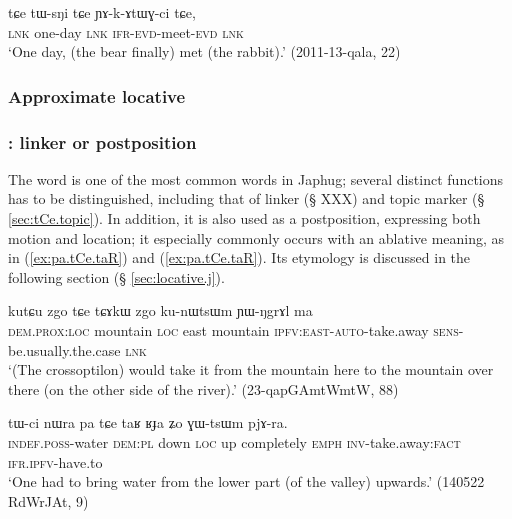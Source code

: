  \begin{exe}
\ex \label{ex:tWsNi.tCe}
\gll   tɕe tɯ-sŋi tɕe ɲɤ-k-ɤtɯɣ-ci tɕe, \\
\textsc{lnk} one-day \textsc{lnk} \textsc{ifr}-\textsc{evd}-meet-\textsc{evd} \textsc{lnk} \\
\glt  `One day, (the bear finally) met (the rabbit).' (2011-13-qala, 22)
\end{exe}


\subsubsection{Approximate locative} \label{sec:approximate.locative}


\subsubsection{: linker or postposition} \label{sec:tCe.postposition}
The word  is one of the most common words in Japhug; several distinct functions has to be distinguished, including that of linker (§ XXX) and topic marker (§ \ref{sec:tCe.topic}). In addition, it is also used as a postposition, expressing both motion and location; it especially commonly occurs with an ablative meaning, as in (\ref{ex:pa.tCe.taR}) and (\ref{ex:pa.tCe.taR}). Its etymology is discussed in the following section (§ \ref{sec:locative.j}).

\begin{exe}
\ex \label{ex:kutɕu.zgo.tCe}
\gll kutɕu zgo tɕe tɕɤkɯ zgo ku-nɯtsɯm ɲɯ-ŋgrɤl ma \\
\textsc{dem}.\textsc{prox}:\textsc{loc} mountain \textsc{loc} east mountain \textsc{ipfv}:\textsc{east}-\textsc{auto}-take.away \textsc{sens}-be.usually.the.case \textsc{lnk} \\
\glt `(The crossoptilon) would take it from the mountain here to the mountain over there (on the other side of the river).' (23-qapGAmtWmtW, 88)
\end{exe}

\begin{exe}
\ex \label{ex:pa.tCe.taR}
\gll tɯ-ci nɯra pa tɕe taʁ ʁɟa ʑo ɣɯ-tsɯm pjɤ-ra. \\
\textsc{indef}.\textsc{poss}-water \textsc{dem}:\textsc{pl} down \textsc{loc} up completely \textsc{emph} \textsc{inv}-take.away:\textsc{fact} \textsc{ifr}.\textsc{ipfv}-have.to \\
\glt `One had to bring water from the lower part (of the valley) upwards.' (140522 RdWrJAt, 9)
\end{exe}


